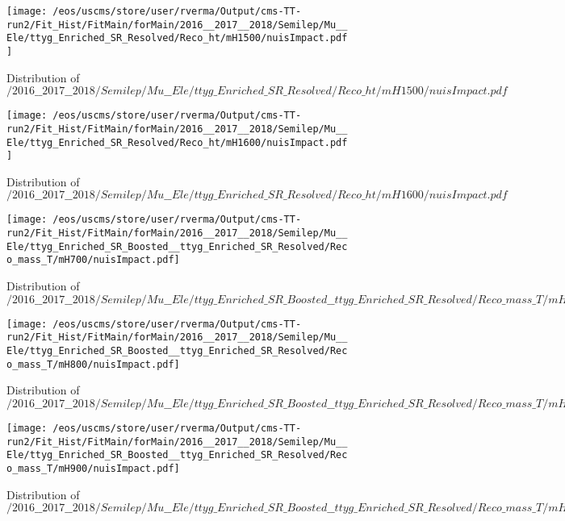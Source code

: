 \begin{figure}
\centering
\texttt{[image: /eos/uscms/store/user/rverma/Output/cms-TT-run2/Fit\_Hist/FitMain/forMain/2016\_\_2017\_\_2018/Semilep/Mu\_\_Ele/ttyg\_Enriched\_SR\_Resolved/Reco\_ht/mH1500/nuisImpact.pdf]}
\caption{Distribution of $/2016\_\_2017\_\_2018/Semilep/Mu\_\_Ele/ttyg\_Enriched\_SR\_Resolved/Reco\_ht/mH1500/nuisImpact.pdf$}
\end{figure}

\begin{figure}
\centering
\texttt{[image: /eos/uscms/store/user/rverma/Output/cms-TT-run2/Fit\_Hist/FitMain/forMain/2016\_\_2017\_\_2018/Semilep/Mu\_\_Ele/ttyg\_Enriched\_SR\_Resolved/Reco\_ht/mH1600/nuisImpact.pdf]}
\caption{Distribution of $/2016\_\_2017\_\_2018/Semilep/Mu\_\_Ele/ttyg\_Enriched\_SR\_Resolved/Reco\_ht/mH1600/nuisImpact.pdf$}
\end{figure}

\begin{figure}
\centering
\texttt{[image: /eos/uscms/store/user/rverma/Output/cms-TT-run2/Fit\_Hist/FitMain/forMain/2016\_\_2017\_\_2018/Semilep/Mu\_\_Ele/ttyg\_Enriched\_SR\_Boosted\_\_ttyg\_Enriched\_SR\_Resolved/Reco\_mass\_T/mH700/nuisImpact.pdf]}
\caption{Distribution of $/2016\_\_2017\_\_2018/Semilep/Mu\_\_Ele/ttyg\_Enriched\_SR\_Boosted\_\_ttyg\_Enriched\_SR\_Resolved/Reco\_mass\_T/mH700/nuisImpact.pdf$}
\end{figure}

\begin{figure}
\centering
\texttt{[image: /eos/uscms/store/user/rverma/Output/cms-TT-run2/Fit\_Hist/FitMain/forMain/2016\_\_2017\_\_2018/Semilep/Mu\_\_Ele/ttyg\_Enriched\_SR\_Boosted\_\_ttyg\_Enriched\_SR\_Resolved/Reco\_mass\_T/mH800/nuisImpact.pdf]}
\caption{Distribution of $/2016\_\_2017\_\_2018/Semilep/Mu\_\_Ele/ttyg\_Enriched\_SR\_Boosted\_\_ttyg\_Enriched\_SR\_Resolved/Reco\_mass\_T/mH800/nuisImpact.pdf$}
\end{figure}

\begin{figure}
\centering
\texttt{[image: /eos/uscms/store/user/rverma/Output/cms-TT-run2/Fit\_Hist/FitMain/forMain/2016\_\_2017\_\_2018/Semilep/Mu\_\_Ele/ttyg\_Enriched\_SR\_Boosted\_\_ttyg\_Enriched\_SR\_Resolved/Reco\_mass\_T/mH900/nuisImpact.pdf]}
\caption{Distribution of $/2016\_\_2017\_\_2018/Semilep/Mu\_\_Ele/ttyg\_Enriched\_SR\_Boosted\_\_ttyg\_Enriched\_SR\_Resolved/Reco\_mass\_T/mH900/nuisImpact.pdf$}
\end{figure}

